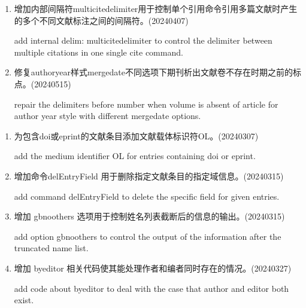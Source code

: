 

\label{up:20240515}
\begin{enumerate}

\item 增加内部间隔符multicitedelimiter用于控制单个引用命令引用多篇文献时产生的多个不同文献标注之间的间隔符。(20240407)

add internal delim: multicitedelimiter to control the delimiter between multiple citations in one single cite command.


\item 修复authoryear样式mergedate不同选项下期刊析出文献卷不存在时期之前的标点。(20240515)

repair the delimiters before number when volume is absent of article for author year style with different  mergedate options.

\end{enumerate}

\label{up:20240327}
\begin{enumerate}

\item 为包含doi或eprint的文献条目添加文献载体标识符OL。(20240307)

add the medium identifier OL for entries containing doi or eprint.

\item 增加命令delEntryField 用于删除指定文献条目的指定域信息。(20240315)

add command delEntryField to delete the specific field for given entries.

\item 增加 gbnoothers 选项用于控制姓名列表截断后的信息的输出。(20240315)

add option gbnoothers to control the output of the information after the truncated name list.

\item 增加 byeditor 相关代码使其能处理作者和编者同时存在的情况。(20240327)

add code about byeditor to deal with the case that author and editor both exist.

\end{enumerate}



